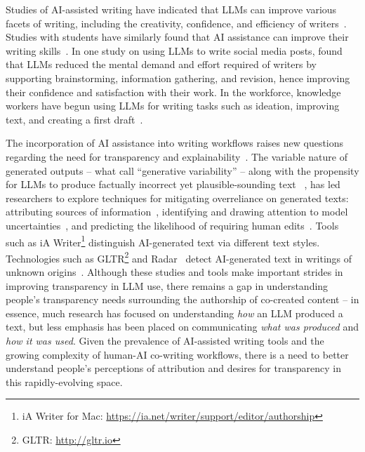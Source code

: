Studies of AI-assisted writing have indicated that LLMs can improve various facets of writing, including the creativity, confidence, and efficiency of writers~\cite{cardon2023challenges, doshi2024generative, li2024value}. Studies with students have similarly found that AI assistance can improve their writing skills~\cite{amyatun2023can, song2023enhancing}. In one study on using LLMs to write social media posts, \citet{long2023tweetorial} found that LLMs reduced the mental demand and effort required of writers by supporting brainstorming, information gathering, and revision, hence improving their confidence and satisfaction with their work. In the workforce, knowledge workers have begun using LLMs for writing tasks such as ideation, improving text, and creating a first draft~\cite{brachman2024knowledge}.

The incorporation of AI assistance into writing workflows raises new questions regarding the need for transparency and explainability~\cite{sun2022investigating}. The variable nature of generated outputs -- what \citet{weisz2024design} call ``generative variability'' -- along with the propensity for LLMs to produce factually incorrect yet plausible-sounding text ~\cite{hicks2024chatgpt}, has led researchers to explore techniques for mitigating overreliance on generated texts: attributing sources of information~\cite{do2024facilitating}, identifying and drawing attention to model uncertainties~\cite{kim2024m, weisz2021perfection}, and predicting the likelihood of requiring human edits~\cite{vasconcelos2023generation}. Tools such as iA Writer\footnote{iA Writer for Mac: \url{https://ia.net/writer/support/editor/authorship}} distinguish AI-generated text via different text styles. Technologies such as GLTR\footnote{GLTR: \url{http://gltr.io}} and Radar~\cite{hu2023radar} detect AI-generated text in writings of unknown origins~\cite{gehrmann2019gltr}. Although these studies and tools make important strides in improving transparency in LLM use, there remains a gap in understanding people's transparency needs surrounding the authorship of co-created content -- in essence, much research has focused on understanding \emph{how} an LLM produced a text, but less emphasis has been placed on communicating \emph{what was produced} and \emph{how it was used}. Given the prevalence of AI-assisted writing tools and the growing complexity of human-AI co-writing workflows, there is a need to better understand people's perceptions of attribution and desires for transparency in this rapidly-evolving space.

